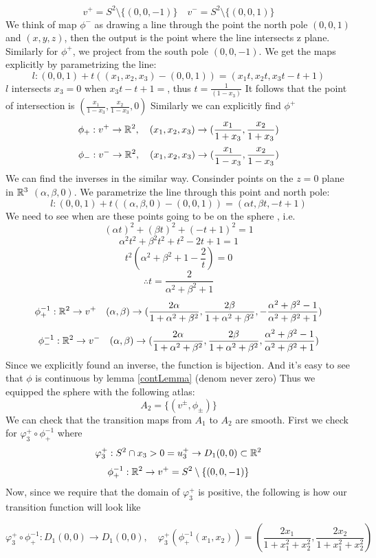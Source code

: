 \documentclass[11pt,a4paper]{report}
\begin{document}
$$ v^{+} = S^2 \setminus \{(0,0,-1)\} \quad v^{-} = S^2 \setminus \{ (0,0,1) \} $$
We think of map $\phi^{-}$ as drawing a line through the point the north pole $(0,0,1)$ and $(x,y,z)$, then the output is the point where the line intersects z plane.
Similarly for $\phi^{+}$, we project from the south pole $(0,0,-1)$. We get the maps explicitly by parametrizing the line:
$$ l: (0,0,1) + t ((x_1,x_2,x_3) - (0,0,1)) =  (x_1 t,x_2 t, x_3 t-t+1) $$
$l$ intersects $x_3=0$ when $x_3t-t+1=$, thus $t = \frac{1}{(1-x_3)}$ It follows that the point of intersection is $(\frac{x_1}{1-x_3},\frac{x_2}{1-x_3},0)$
Similarly we can explicitly find $\phi^{+}$
$$ \phi_{+}: v^{+} \to \mathbb{R}^2, \quad (x_1,x_2,x_3) \to (\frac{x_1}{1+x_3}, \frac{x_2}{1+x_3} )$$
$$ \phi_{-}: v^{-} \to \mathbb{R}^2, \quad (x_1,x_2,x_3) \to (\frac{x_1}{1-x_3}, \frac{x_2}{1-x_3} )$$
We can find the inverses in the similar way.
Consinder points on the $z=0$ plane in $\mathbb{R}^3$ $(\alpha, \beta, 0)$. We parametrize the line through this point and north pole:
$$ l: (0,0,1) + t((\alpha, \beta, 0 ) - (0,0,1)) = (\alpha t, \beta t, -t +1)$$
We need to see when are these points going to be on the sphere , i.e.
$$ (\alpha t)^2  + (\beta t)^2 + (-t +1)^2 = 1 $$
$$ \alpha^2 t^2 + \beta^2 t^2 + t^2 - 2t + 1 = 1 $$
$$ t^2 (\alpha^2 + \beta^2 +1 - \frac{2}{t} ) = 0 $$
$$ \therefore t = \frac{2}{\alpha^2 + \beta^2 +1 } $$
$$ \phi_{+}^{-1}:
\mathbb{R}^2 \to v^{+} 
\quad (\alpha, \beta)  \to
( \frac{2 \alpha}{1+\alpha^2+\beta^2},
  \frac{2 \beta}{1+\alpha^2+\beta^2},
  - \frac{\alpha^2+\beta^2-1}{\alpha^2+\beta^2+1})
$$
$$ \phi_{-}^{-1}:
\mathbb{R}^2 \to v^{-}
\quad (\alpha,\beta) \to
( \frac{2\alpha}{1+\alpha^2+\beta^2}, 
\frac{2\beta}{1+\alpha^2+\beta^2}, 
 \frac{\alpha^2 + \beta^2 -1}{\alpha^2+\beta^2+1} )
$$
Since we explicitly found an inverse, the function is bijection.
\newline
And it's easy to see that $\phi$ is continuous by lemma \ref{contLemma} (denom never zero)
Thus we equipped the sphere with the following atlas:
$$ A_2 = \{(v^{\pm},\phi_{\pm}) \} $$
We can check that the transition maps from $A_1$ to $A_2$ are smooth. \newline
First we check for $\varphi_3^{+} \circ \phi_{+}^{-1}$ where
$$ \varphi_3^{+}: S^2 \cap {x_3 > 0} = u_3^{+} \to D_1(0,0) \subset \mathbb{R}^2 $$
$$ \phi_{+}^{-1}: \mathbb{R}^2 \to v^{+} = S^2 \setminus \{ (0,0,-1) \} $$
Now, since we require that the domain of $\varphi_3^{+}$ is positive, the following is how our transition function will look like

$$\varphi_3^{+} \circ \phi_{+}^{-1}: D_1 (0,0) \to D_1(0,0), \quad \varphi_3^{+}( \phi_{+}^{-1}(x_1,x_2)) = (\frac{2x_1}{1+x_1^2+x_2^2}, \frac{2x_2}{1+x_1^2+x_2^2})$$
\end{document}
